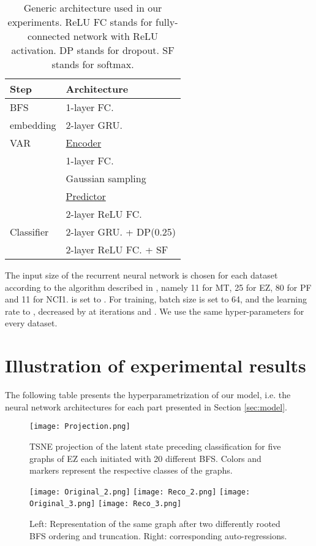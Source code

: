 \documentclass{article} \usepackage{iclr2019_conference}
\begin{document}
\begin{table}
\centering
  \begin{center}
  
    \begin{tabular}{l|l}
      \textbf{Step} & \textbf{Architecture}  \\
      \hline
       BFS          & 1-layer FC.  \\
       embedding    & 2-layer GRU.  \\
       \hline
       VAR          & \underline{Encoder} \\
                    & 1-layer FC.  \\
                    &       Gaussian sampling \\
                    & \underline{Predictor} \\ 
                    & 2-layer ReLU FC.  \\
        \hline
       Classifier   & 2-layer GRU.  + DP(0.25) \\
                    & 2-layer ReLU FC.  + SF \\
    \end{tabular}
  \end{center}
  \caption{Generic architecture used in our experiments. ReLU FC stands for fully-connected network with ReLU activation. DP stands for dropout. SF stands for softmax.}
  \label{tab:table1}
\end{table}

The input size  of the recurrent neural network is chosen for each dataset according to the algorithm described in \citep{you2018graphrnn}, namely 11 for MT, 25 for EZ, 80 for PF and 11 for NCI1.  is set to . For training, batch size is set to 64, and the learning rate to , decreased by  at iterations  and . We use the same hyper-parameters for every dataset.

\section{Illustration of experimental results}

The following table presents the hyperparametrization of our model, i.e. the neural network architectures for each part presented in Section \ref{sec:model}.

\begin{figure}[h]
    \centering
    \texttt{[image: Projection.png]}
    \caption{TSNE projection of the latent state preceding classification for five graphs of EZ each initiated with 20 different BFS. Colors and markers represent the respective classes of the graphs.}
    \label{fig:projection}
\end{figure}


\begin{figure}
    \centering
    \texttt{[image: Original\_2.png]}
    \texttt{[image: Reco\_2.png]}
    \texttt{[image: Original\_3.png]}
    \texttt{[image: Reco\_3.png]}
    \caption{Left: Representation of the same graph after two differently rooted BFS ordering and truncation. Right: corresponding auto-regressions.}
    \label{fig:reconstructions}
\end{figure}
\end{document}
